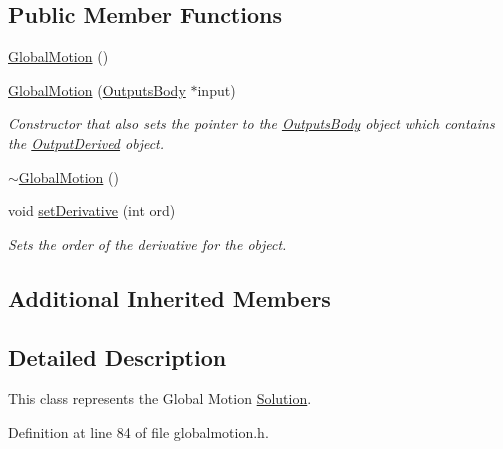\subsection*{Public Member Functions}
\begin{DoxyCompactItemize}
\item 
\hyperlink{classosea_1_1ofreq_1_1_global_motion_afe0b801895608782addf27d231bce572}{Global\-Motion} ()
\item 
\hyperlink{classosea_1_1ofreq_1_1_global_motion_ae7155de9b1cb90cbd1d36e7714c1a3ce}{Global\-Motion} (\hyperlink{classosea_1_1ofreq_1_1_outputs_body}{Outputs\-Body} $\ast$input)
\begin{DoxyCompactList}\small\item\em Constructor that also sets the pointer to the \hyperlink{classosea_1_1ofreq_1_1_outputs_body}{Outputs\-Body} object which contains the \hyperlink{classosea_1_1ofreq_1_1_output_derived}{Output\-Derived} object. \end{DoxyCompactList}\item 
\hyperlink{classosea_1_1ofreq_1_1_global_motion_aee21eade3de9cb666a6b8fa42cf1e9e1}{$\sim$\-Global\-Motion} ()
\item 
void \hyperlink{classosea_1_1ofreq_1_1_global_motion_a15a8c0d57ffedf65a1cd84154cdaa6ae}{set\-Derivative} (int ord)
\begin{DoxyCompactList}\small\item\em Sets the order of the derivative for the object. \end{DoxyCompactList}\end{DoxyCompactItemize}
\subsection*{Additional Inherited Members}


\subsection{Detailed Description}
This class represents the Global Motion \hyperlink{classosea_1_1ofreq_1_1_solution}{Solution}. 

Definition at line 84 of file globalmotion.\-h.



